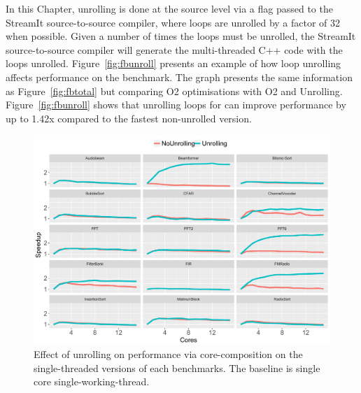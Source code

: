 In this Chapter, unrolling is done at the source level via a flag passed to the StreamIt source-to-source compiler, where loops are unrolled by a factor of 32 when possible.
Given a number of times the loops must be unrolled, the StreamIt source-to-source compiler will generate the multi-threaded C++ code with the loops unrolled.
Figure~\ref{fig:fbunroll} presents an example of how loop unrolling affects performance on the  benchmark.
The graph presents the same information as Figure~\ref{fig:fbtotal} but comparing O2 optimisations with O2 and Unrolling.
Figure~\ref{fig:fbunroll} shows that unrolling loops for  can improve performance by up to 1.42x compared to the fastest non-unrolled version.

\begin{figure}[t]
  \includegraphics[width=1\textwidth]{streamit-paper/graphics/unroll_speed_bars2.pdf}
  \vspace{-1em}
  \caption{Effect of unrolling on performance via core-composition on the single-threaded versions of each benchmarks. The baseline is single core single-working-thread.}\label{fig:unroll_summary}
  \vspace{-1em}
\end{figure}


